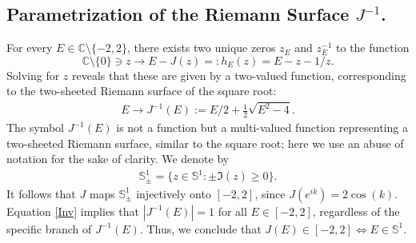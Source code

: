 \documentclass[12pt,oneside,onecolumn,open]{article}
\newtheorem{defi}[teo]{Definition}
\begin{document}
\color{black}



\subsection{Parametrization  of the Riemann  Surface $ J^{-1} $.}\label{ResGreen}




    

    For every $E\in \mathbb{C} \setminus \{-2, 2 \}$, there exists two unique  zeros  $z_E   $ and $z_E^{-1}$ to the function  
    $$ \mathbb{C} \setminus \{ 0 \} \ni z \to  E - J(z) =: h_E(z)  = E - z- 1/z  . $$ 
    Solving for $z$ reveals that these are given by a two-valued function, corresponding to the two-sheeted Riemann surface of the square root:
      \begin{align}\label{Inv}
          E  \to J^{-1}(E) := E/2 + \frac{1}{2} \sqrt{ E^2 -4   }.  
      \end{align}
The symbol \( J^{-1}(E) \) is not a function but a multi-valued function representing a two-sheeted Riemann surface, similar to the square root; here we use an abuse of notation for the sake of clarity.       We denote by 
\begin{align}
   \mathbb{S}^{1}_{\pm}=\{z\in \mathbb{S}^{1}: \pm \Im (z)\geq 0\}. 
\end{align}
It follows that \( J \) maps \( \mathbb{S}^{1}_{\pm} \) injectively onto \( [-2, 2] \), since \( J(e^{ik}) = 2 \cos(k) \). Equation \eqref{Inv} implies that \( |J^{-1}(E)| = 1 \) for all \( E \in [-2,2] \), regardless of the specific branch of \( J^{-1}(E) \). Thus, we conclude that \( J(E) \in [-2,2] \iff E \in \mathbb{S}^1 \).  
\end{document}
